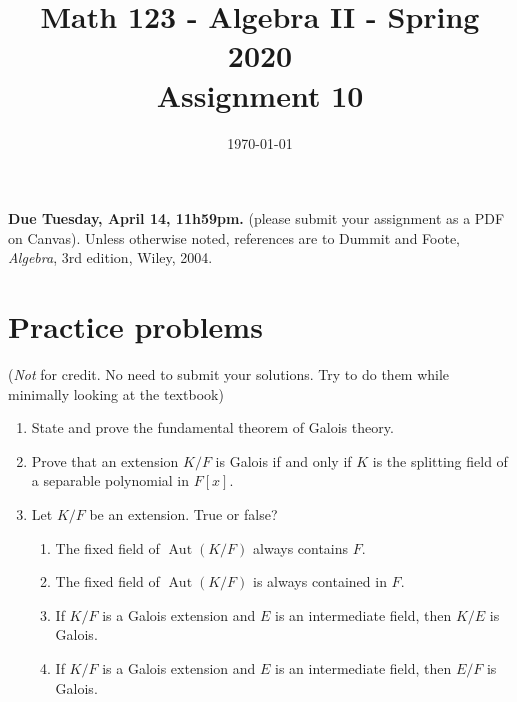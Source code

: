 \documentclass{amsart}
\title[Math 123, Spring 2020: assignment 10]{Math 123 - Algebra II - Spring 2020 \\ Assignment 10}
\date{\today}
\theoremstyle{definition}
\newcommand{\Aut}{\operatorname{Aut}}
\begin{document}

\vspace*{-10em}
\maketitle

\textbf{Due Tuesday, April 14, 11h59pm.} (please submit your assignment as a PDF on Canvas). Unless otherwise noted, references are to Dummit and Foote, \emph{Algebra}, 3rd edition, Wiley, 2004.

\section*{Practice problems} (\emph{Not} for credit. No need to submit your solutions. Try to do them while minimally looking at the textbook)

\begin{enumerate}
\item State and prove the fundamental theorem of Galois theory.
\item Prove that an extension $K / F$ is Galois if and only if $K$ is the splitting field of a separable polynomial in $F[x]$.
\item Let $K / F$ be an extension. True or false?
  \begin{enumerate}
  \item The fixed field of $\Aut (K / F)$ always contains $F$.
  \item The fixed field of $\Aut (K / F)$ is always contained in $F$.
  \item If $K / F$ is a Galois extension and $E$ is an intermediate field, then $K / E$ is Galois.
  \item If $K / F$ is a Galois extension and $E$ is an intermediate field, then $E / F$ is Galois.
  \end{enumerate}
\end{enumerate}
\end{document}
